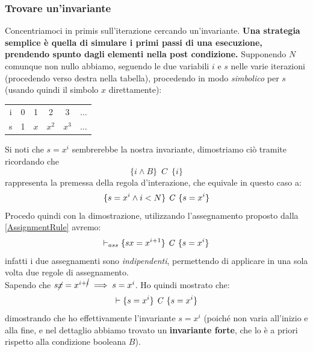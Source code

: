 \begin{esempio}
				      			\subsubsection{Trovare un'invariante}
				      			Concentriamoci in primis sull'iterazione cercando un'invariante. \textbf{Una strategia
				      			semplice è quella di simulare i primi passi di una esecuzione, prendendo spunto dagli elementi nella post condizione.} Supponendo $N$
				      			comunque non nullo abbiamo, seguendo le due variabili $i$ e $s$ nelle varie
				      			iterazioni (procedendo verso destra nella tabella), procedendo in modo
				      			\textit{simbolico} per $s$ (usando quindi il simbolo $x$ direttamente):
				      			\begin{table}[H]
				      				\centering
				      				\begin{tabular}[H]{c|ccccc}
				      					i & 0 & 1   & 2     & 3     & $\ldots$ \\
				      					s & 1 & $x$ & $x^2$ & $x^3$ & $\ldots$ 
				      				\end{tabular}
				      			\end{table}
				      			Si noti che $s= x^i$ sembrerebbe la nostra invariante, dimostriamo ciò tramite ricordando che 
				      			\[\{i\land B\}\,\,\,C\,\,\,\{i\}\] rappresenta la premessa della regola d'interazione, che equivale in questo caso a:
				      			\[\{s=x^i\land i<N\}\mbox{ \textit{C} }\{s=x^i\}\]
				      			Procedo quindi con la dimostrazione, utilizzando l'assegnamento proposto dalla \ref{AssignmentRule} avremo:
				      			\[\vdash_{ass}\{sx=x^{i+1}\}\mbox{ \textit{C} }\{s=x^i\}\]
				      			infatti i due assegnamenti sono \emph{indipendenti}, permettendo di applicare
				      			in una sola volta due regole di assegnamento.\\
				      			Sapendo che $s\cancel{x}=x^{i+\cancel{i}}\implies s=x^i$. Ho quindi mostrato
				      			che:
				      			\[\vdash \{s=x^i\}\mbox{ \textit{C} }\{s=x^i\}\]
				      			dimostrando che ho effettivamente l'invariante $s= x^i$ (poiché non varia all'inizio e alla fine, e nel dettaglio
				      			abbiamo trovato un \textbf{invariante forte}, che lo è a priori rispetto alla
				      			condizione booleana $B$).\\
				      							      			  

\end{esempio}
